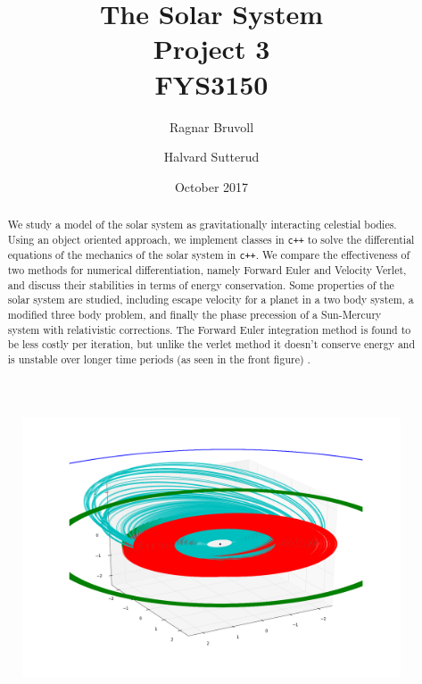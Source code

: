 \documentclass[10pt]{article}
\begin{document}
\title{The Solar System
\\ Project 3
\\ FYS3150}
\author{Ragnar Bruvoll \and Halvard Sutterud}
\date{October 2017}
\maketitle{\begin{center}\end{center}}
\thispagestyle{empty}

\begin{figure}[htpb]
    \centering
    \includegraphics[width=0.8\linewidth]{../results/front.png}
    \label{fig:name}
\end{figure}

\begin{abstract}
    We study a model of the solar system as gravitationally interacting
    celestial bodies.  Using an object oriented approach, we implement
    classes in \texttt{c++} to solve the differential equations of the
    mechanics of the solar system in \texttt{c++}. We compare the effectiveness of
    two methods for numerical differentiation, namely Forward Euler and
    Velocity Verlet, and discuss their stabilities in terms of energy
    conservation. Some properties of the solar system are studied, including
    escape velocity for a planet in a two body system, a modified three
    body problem, and finally the phase precession of a Sun-Mercury system
    with relativistic corrections. 
    The Forward Euler integration method is found to be less costly per
    iteration, but unlike the verlet method it doesn't conserve energy and
    is unstable over longer time periods (as seen in the front figure) . 
\end{abstract}
\end{document}
